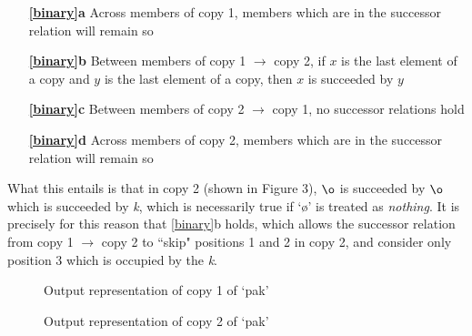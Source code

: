 \documentclass{article}
\begin{document}
\begin{itemize}
    \item [\textbf{\ref{binary}a}] Across members of copy 1, members which are in the successor relation will remain so
    \item [\textbf{\ref{binary}b}] Between members of copy 1 $\rightarrow$ copy 2, if $x$ is the last element of a copy and $y$ is the last element of a copy, then $x$ is succeeded by $y$
    \item [\textbf{\ref{binary}c}] Between members of copy 2 $\rightarrow$ copy 1, no successor relations hold
    \item [\textbf{\ref{binary}d}] Across members of copy 2, members which are in the successor relation will remain so
\end{itemize}

What this entails is that in copy 2 (shown in Figure 3), $\o$  is succeeded by $\o$ which is succeeded by \textit{k}, which is necessarily true if ‘\o' is treated as \textit{nothing}. It is precisely for this reason that \ref{binary}b holds, which allows the successor relation from copy 1 $\rightarrow$ copy 2 to “skip" positions 1 and 2 in copy 2, and consider only position 3 which is occupied by the \textit{k}.

\pagebreak
\begin{figure}[ht]
    \centering
    \caption{Output representation of copy 1 of ‘pak'}
\end{figure}

\begin{figure}[ht]
    \centering
    \caption{Output representation of copy 2 of ‘pak'}
\end{figure}
\end{document}
